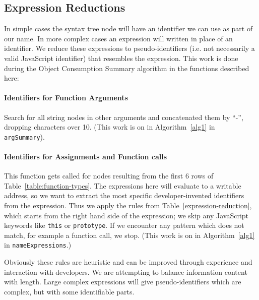 \documentclass[10pt, preprint]{sigplanconf}
\begin{document}
\subsection{Expression Reductions}
\label{sec:general-element-naming}

In simple cases the syntax tree node will have an identifier we can use as part of our name. In more complex cases an expression will written in place of an identifier. We reduce these expressions to pseudo-identifiers (i.e. not necessarily a valid JavaScript identifier) that resembles the expression. This work is done during the Object Consumption Summary algorithm in the functions described here:
\paragraph{Identifiers for Function Arguments} Search for all string nodes in other arguments and concatenated them by ``-'', dropping  characters over 10.  
 (This work is on in Algorithm~\ref{alg1} in \verb|argSummary|).
\paragraph{Identifiers for Assignments and Function calls} This function gets called for nodes resulting from the first 6 rows of Table~\ref{table:function-types}. The expressions here will evaluate to a writable address, so we want to extract the most specific developer-invented identifiers from the expression. Thus we apply the rules from Table~\ref{expression-reduction}, which starts from the right hand side of the expression;  we skip any JavaScript keywords like \texttt{this} or \texttt{prototype}. If we encounter any pattern which does not match, for example a function call, we stop.   (This work is on in Algorithm~\ref{alg1} in \verb|nameExpressions|.)

Obviously these rules are heuristic and can be improved through experience and interaction with developers. We are attempting to balance information content with length. Large complex expressions will give pseudo-identifiers which are complex, but with some identifiable parts.
\end{document}
